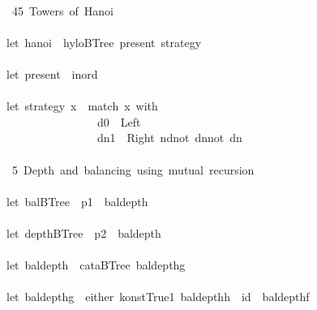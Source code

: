 \documentclass[a4paper]{article}
\begin{document}
\begin{tabbing}
\ttfamily ~\\
\ttfamily ~~45~Towers~of~Hanoi~\\
\ttfamily ~\\
\ttfamily ~let~hanoi~~hyloBTree~present~strategy\\
\ttfamily ~\\
\ttfamily ~let~present~~inord\\
\ttfamily ~\\
\ttfamily ~let~strategy~x~~match~x~with\\
\ttfamily ~~~~~~~~~~~~~~~~~d0~~Left~\\
\ttfamily ~~~~~~~~~~~~~~~~~dn1~~Right~ndnot~dnnot~dn\\
\ttfamily ~\\
\ttfamily ~~5~Depth~and~balancing~using~mutual~recursion~\\
\ttfamily ~\\
\ttfamily ~let~balBTree~~p1~~baldepth\\
\ttfamily ~\\
\ttfamily ~let~depthBTree~~p2~~baldepth\\
\ttfamily ~\\
\ttfamily ~let~baldepth~~cataBTree~baldepthg\\
\ttfamily ~\\
\ttfamily ~let~baldepthg~~either~konstTrue1~baldepthh~~id~~baldepthf\\

\end{tabbing}
\end{document}
